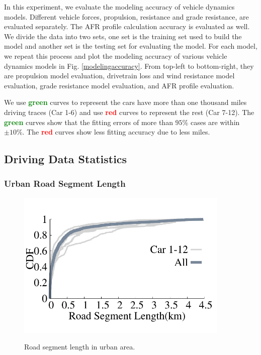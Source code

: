 In this experiment, we evaluate the modeling accuracy of vehicle dynamics models. 
Different vehicle forces, propulsion, resistance and grade resistance, are
evaluated separately. 
The AFR profile calculation accuracy is evaluated as well. 
We divide the data into two sets, one set is the training set 
used to build the model and another set is the testing set
for evaluating the model. 
For each model, we repeat this process and plot the 
modeling accuracy of various vehicle dynamics models in Fig. \ref{modelingaccuracy}. 
From top-left to bottom-right, they are propulsion model evaluation, 
drivetrain loss and wind resistance model evaluation, 
grade resistance model evaluation, 
and AFR profile evaluation. 


We use \textcolor{green}{\textbf{green}} curves to represent the cars have more than one thousand miles
driving traces (Car 1-6) and use \textcolor{red}{\textbf{red}} curves to represent the rest (Car 7-12). 
The \textcolor{green}{\textbf{green}} curves show that the fitting errors of 
more than $95\%$ cases are within $\pm10\%$. 
The \textcolor{red}{\textbf{red}} curves show less fitting accuracy 
due to less miles. 




\subsection{Driving Data Statistics}

\subsubsection{Urban Road Segment Length}

\begin{figure}[ht]
\begin{center}
\vspace{-0.3cm}
\includegraphics[width=4.0in,angle=0]{Figs/EcoDrive/evaluation/urban_road_segment.pdf}
\vspace{-0.0cm}
\caption{Road segment length in urban area.}
\vspace{-0.8cm}
\label{urbanroad}
\end{center}
\end{figure}

